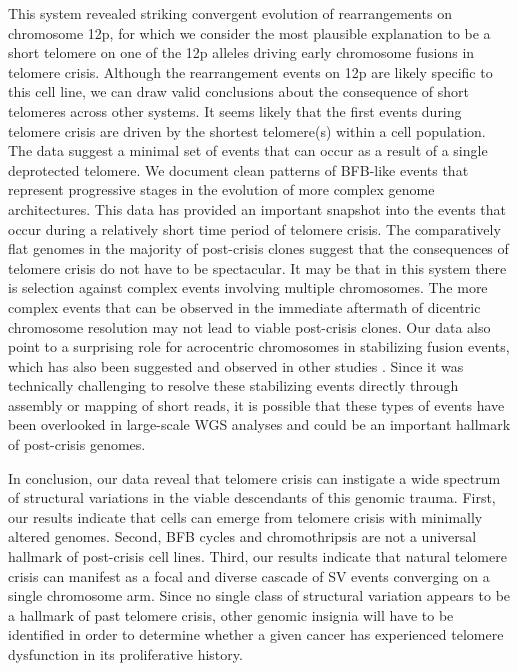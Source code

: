 \documentclass[phd,tocprelim]{cornell}
\begin{document}
This system revealed striking convergent evolution of rearrangements on chromosome 12p, for which we consider the most plausible explanation to be a short telomere on one of the 12p alleles driving early chromosome fusions in telomere crisis. Although the rearrangement events on 12p are likely specific to this cell line, we can draw valid conclusions about the consequence of short telomeres across other systems. It seems likely that the first events during telomere crisis are driven by the shortest telomere(s) within a cell population. The data suggest a minimal set of events that can occur as a result of a single deprotected telomere. We document clean patterns of BFB-like events that represent progressive stages in the evolution of more complex genome architectures. This data has provided an important snapshot into the events that occur during a relatively short time period of telomere crisis. The comparatively flat genomes in the majority of post-crisis clones suggest that the consequences of telomere crisis do not have to be spectacular. It may be that in this system there is selection against complex events involving multiple chromosomes. The more complex events that can be observed in the immediate aftermath of dicentric chromosome resolution \cite{Umbreit2020-kr} may not lead to viable post-crisis clones. Our data also point to a surprising role for acrocentric chromosomes in stabilizing fusion events, which has also been suggested and observed in other studies \cite{Umbreit2020-kr,Stimpson2010-uu}. Since it was technically challenging to resolve these stabilizing events directly through assembly or mapping of short reads, it is possible that these types of events have been overlooked in large-scale WGS analyses and could be an important hallmark of post-crisis genomes.

In conclusion, our data reveal that telomere crisis can instigate a wide spectrum of structural variations in the viable descendants of this genomic trauma. First, our results indicate that cells can emerge from telomere crisis with minimally altered genomes. Second, BFB cycles and chromothripsis are not a universal hallmark of post-crisis cell lines. Third, our results indicate that natural telomere crisis can manifest as a focal and diverse cascade of SV events converging on a single chromosome arm. Since no single class of structural variation appears to be a hallmark of past telomere crisis, other genomic insignia will have to be identified in order to determine whether a given cancer has experienced telomere dysfunction in its proliferative history.
\end{document}
